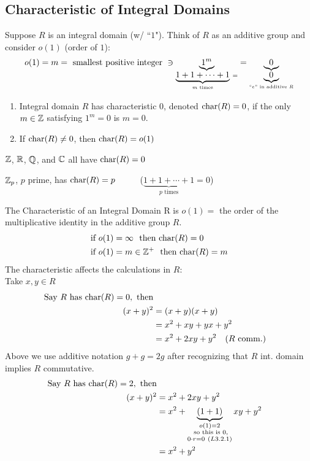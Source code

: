 \subsection*{Characteristic of Integral Domains}
Suppose $R$ is an integral domain (w/ ``$1$"). Think of $R$ as an additive group and consider $o(1)$ (order of $1$):
\begin{align}
    o(1)=m = \text{ smallest positive integer }\ni \underbrace{1^m}_{\underbrace{1+1+\cdots+1}_{m \text{ times}}\ =} = \underbrace{0}_{\underbrace{0}_{``e" \text{ in additive }R}} \nonumber
\end{align}
\begin{definition}
\begin{enumerate}
    \item Integral domain $R$ has characteristic $0$, denoted $\text{char}(R)=0$, if the only $m\in {\mathbb{ Z}}$ satisfying $1^m=0$ is $m=0$.
    \item If $\text{char}(R)\neq 0$, then $\text{char}(R)=o(1)$
\end{enumerate}
\end{definition}

\begin{example}
    ${\mathbb{ Z}}$, ${\mathbb{ R}}$, ${\mathbb{ Q}}$, and ${\mathbb{ C}}$ all have $\text{char}(R)=0$
\end{example}
\newpage
\begin{example}
    ${\mathbb{ Z}}_p$, $p$ prime, has $\text{char}(R)=p$ \ \ \ \ \ ($\underbrace{1+1+\cdots +1}_{p \text{ times}} = 0$)
\end{example}
\noindent The Characteristic of an Integral Domain R is $o(1)=$ the order of the multiplicative identity in the additive group $R$.
\begin{align}
    \text{if }o(1)&=\infty \ \text{ then }\text{char}(R)=0 \nonumber \\
    \text{if }o(1)&=m\in {\mathbb{ Z}}^{+} \ \text{ then }\text{char}(R)=m \nonumber
\end{align}
The characteristic affects the calculations in $R$: \\ 
Take $x,y\in R$
\begin{align}
    \text{Say }R \text{ has }\text{char}(R)=0, \text{ then} \nonumber \\
    (x+y)^2 &= (x+y)(x+y) \nonumber \\
    &= x^2+xy+yx+y^2 \nonumber \\
    &= x^2 + 2xy + y^2  \ \ \ (R\text{ comm.}) \nonumber 
\end{align}
Above we use additive notation $g+g=2g$ after recognizing that $R$ int. domain implies $R$ commutative.
\begin{align}
    \text{Say }R \text{ has }\text{char}(R)=2, \text{ then} \nonumber \\
    (x+y)^2 &= x^2 + 2xy + y^2  \nonumber \\
    &= x^2+\underbrace{(1+1)}_{\substack{o(1)=2 \\ \text{ so this is }0, \\ 0\cdot r = 0 \ (L3.2.1)}}xy+y^2 \nonumber \\
    &= x^2+y^2 \nonumber
\end{align}

